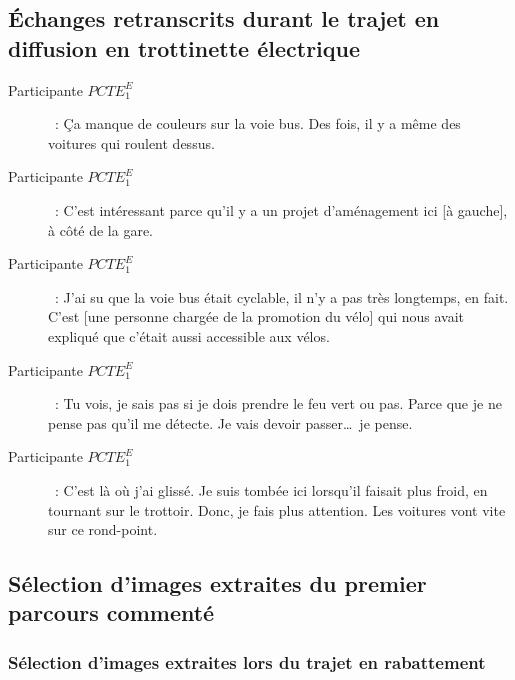 \subsection{Échanges retranscrits durant le trajet en diffusion en trottinette électrique}

\begin{description}
    \item[Participante \(PCTE^{E}_{1}\)]~: Ça manque de couleurs sur la voie bus. Des fois, il y a même des voitures qui roulent dessus.
    \item[Participante \(PCTE^{E}_{1}\)]~: C’est intéressant parce qu’il y a un projet d’aménagement ici [à gauche], à côté de la gare.
    \item[Participante \(PCTE^{E}_{1}\)]~: J’ai su que la voie bus était cyclable, il n’y a pas très longtemps, en fait. C’est [une personne chargée de la promotion du vélo] qui nous avait expliqué que c’était aussi accessible aux vélos.
    \item[Participante \(PCTE^{E}_{1}\)]~: Tu vois, je sais pas si je dois prendre le feu vert ou pas. Parce que je ne pense pas qu’il me détecte. Je vais devoir passer\dots~je pense.
    \item[Participante \(PCTE^{E}_{1}\)]~: C’est là où j’ai glissé. Je suis tombée ici lorsqu’il faisait plus froid, en tournant sur le trottoir. Donc, je fais plus attention. Les voitures vont vite sur ce rond-point.
\end{description}%

    \newpage
\subsection{Sélection d'images extraites du premier parcours commenté}
    \label{annexes:photos-pcte1}

\subsubsection{Sélection d'images extraites lors du trajet en rabattement}


